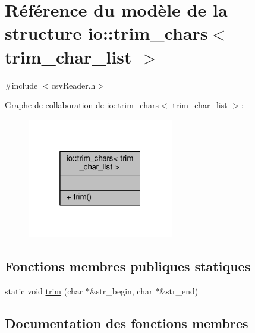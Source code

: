 \hypertarget{structio_1_1trim__chars}{}\section{Référence du modèle de la structure io\+:\+:trim\+\_\+chars$<$ trim\+\_\+char\+\_\+list $>$}
\label{structio_1_1trim__chars}


{\ttfamily \#include $<$csv\+Reader.\+h$>$}



Graphe de collaboration de io\+:\+:trim\+\_\+chars$<$ trim\+\_\+char\+\_\+list $>$\+:
\nopagebreak
\begin{figure}[H]
\begin{center}
\leavevmode
\includegraphics[width=181pt]{structio_1_1trim__chars__coll__graph}
\end{center}
\end{figure}
\subsection*{Fonctions membres publiques statiques}
\begin{DoxyCompactItemize}
\item 
static void \hyperlink{structio_1_1trim__chars_a4cffc5e839ab4024ca8c8330e26e338c}{trim} (char $\ast$\&str\+\_\+begin, char $\ast$\&str\+\_\+end)
\end{DoxyCompactItemize}


\subsection{Documentation des fonctions membres}
\mbox{\label{structio_1_1trim__chars_a4cffc5e839ab4024ca8c8330e26e338c}} 
